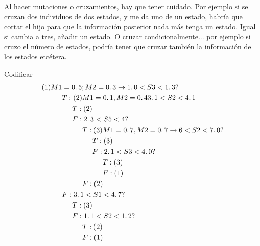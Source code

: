 \begin{nota}
	Al hacer mutaciones o cruzamientos, hay que tener cuidado. Por ejemplo si se cruzan dos individuos
	de dos estados, y me da uno de un estado, habría que cortar el hijo para que la información posterior nada
	más tenga un estado. Igual si cambia a tres, añadir un estado. O cruzar condicionalmente... por ejemplo si
	cruzo el número de estados, podría tener que cruzar también la información de los estados etcétera.
\end{nota}

\begin{ejemplo}
	Codificar 
	\begin{equation}
	\begin{aligned}
		(1) M1 & = 0\ldotp 5; M2 = 0\ldotp3 \rightarrow 1 \ldotp 0 < S3 < 1\ldotp3 ? \\
		& T: (2) M1 = 0\ldotp1, M2 = 0\ldotp4  3\ldotp1 < S2 < 4\ldotp1 \\
		&\hspace{0.5cm} T: (2) \\
		&\hspace{0.5cm} F: 2\ldotp3 < S5 < 4 ? \\
		&\hspace{1cm}T: (3) M1 = 0\ldotp7, M2 = 0\ldotp7 \rightarrow 6 < S2 < 7\ldotp0 ? \\
		& \hspace{1.5cm} T: (3) \\ 
		& \hspace{1.5cm}F: 2\ldotp1 < S3 < 4\ldotp0 ? \\ 
		& \hspace{2cm}T: (3) \\
		& \hspace{2cm}F: (1) \\
		& \hspace{1cm}F: (2) \\ 
		& F: 3\ldotp1 < S1 < 4\ldotp7 ? \\
		& \hspace{0.5cm} T: (3) \\ 
		& \hspace{0.5cm}F: 1\ldotp1 < S2 < 1\ldotp2 ? \\
		& \hspace{1cm}T: (2) \\
		& \hspace{1cm}F: (1) \\ 
	\end{aligned}
	\end{equation}
\end{ejemplo}
